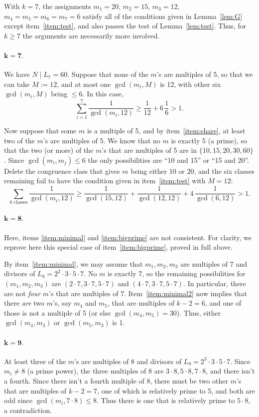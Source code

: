 \documentclass[12pt]{article}
\begin{document}
With $k=7$, the assignments $m_1=20$, $m_2=15$, $m_3=12$, $m_4=m_5=m_6=m_7=6$ satisfy all of the conditions
given in Lemma~\ref{lem:G} except item~\ref{item:test}, and also passes the test of Lemma~\ref{lem:test}. Thus,
for $k\ge7$ the arguments are necessarily more involved.

\paragraph{$\mathbf{k=7}.$}
We have $N \mid L_7 = 60$. Suppose that none of the $m$'s are multiples of 5, so that we can take $M:=12$, and
at most one $\gcd(m_i,M)$ is 12, with other six $\gcd(m_i,M)$ being $\le 6$. In this case,
    \[\sum_{i=1}^7 \frac{1}{\gcd(m_i,12)} \ge \frac 1{12}+6\,\frac16 >1.\]

Now suppose that some $m$ is a multiple of 5, and by item~\ref{item:share}, at least two of the $m$'s are
multiples of 5. We know that no $m$ is exactly 5 (a prime), so that the two (or more) of the $m$'s that are
multiples of 5 are in $\{10, 15, 20, 30, 60\}$. Since $\gcd(m_i,m_j)\le 6$ the only possibilities are ``10 and
15'' or ``15 and 20''. Delete the congruence class that gives $m$ being either 10 or 20, and the six classes
remaining fail to have the condition given in item~\ref{item:test} with $M=12$:
    \[\sum_{\text{6 classes}} \frac{1}{\gcd(m_i,12)} \ge \frac{1}{\gcd(15,12)}+\frac{1}{\gcd(12,12)}+
        4\,\frac{1}{\gcd(6,12)} >1.\]

\paragraph{$\mathbf{k=8}.$}
Here, items \ref{item:minimal} and \ref{item:bigprime} are not consistent. For clarity, we reprove here this
special case of item~\ref{item:bigprime}, proved in full above.

By item~\ref{item:minimal}, we may assume that $m_1,m_2,m_3$ are multiples of 7 and divisors of
$L_8=2^2\cdot3\cdot5\cdot7$. No $m$ is exactly 7, so the remaining possibilities for $(m_1,m_2,m_3)$ are
$(2\cdot7, 3\cdot 7, 5 \cdot 7)$ and $(4\cdot7, 3\cdot 7, 5 \cdot 7)$. In particular, there are not {\em four}
$m$'s that are multiples of 7. Item~\ref{item:minimal2} now implies that there {\em are} two $m$'s, say $m_4$
and $m_5$, that are multiples of $k-2=6$, and one of those is not a multiple of 5 (or else $\gcd(m_4,m_5)=30$).
Thus, either $\gcd(m_4,m_3)$ or $\gcd(m_5,m_3)$ is 1.

\paragraph{$\mathbf{k=9}.$}
At least three of the $m$'s are multiples of 8 and divisors of $L_9=2^3\cdot 3\cdot5\cdot7$. Since $m_i\not=8$
(a prime power), the three multiples of 8 are $3\cdot 8, 5\cdot 8, 7\cdot 8$, and there isn't a fourth. Since
there isn't a fourth multiple of 8, there must be two other $m$'s that are multiples of $k-2=7$, one of which is
relatively prime to 5, and both are odd since $\gcd(m_i,7\cdot 8) \le 8$. Thus there is one that is relatively
prime to $5\cdot 8$, a contradiction.
\end{document}
